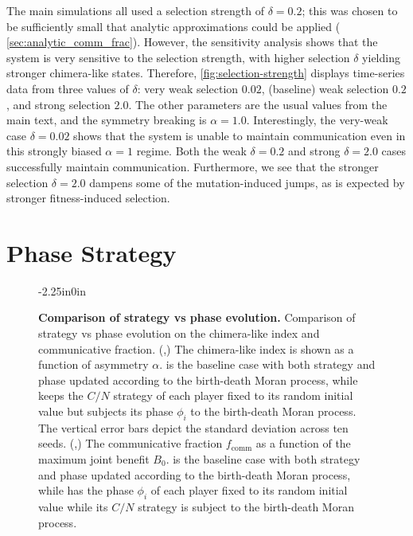 \documentclass[10pt,letterpaper]{article}
\begin{document}
The main simulations all used a selection strength of $\delta = 0.2$;
this was chosen to be sufficiently small that analytic approximations
could be applied (\cf{} \cref{sec:analytic_comm_frac}).
However, the sensitivity analysis shows that the system is very
sensitive to the selection strength, with higher selection $\delta$
yielding stronger chimera-like states.
Therefore, \cref{fig:selection-strength} displays time-series data
from three values of $\delta$: very weak selection $0.02$, (baseline)
weak selection $0.2$, and strong selection $2.0$.
The other parameters are the usual values from the main text,
and the symmetry breaking is $\alpha = 1.0$.
Interestingly, the very-weak case $\delta = 0.02$ shows that the system
is unable to maintain communication even in this strongly biased
$\alpha=1$ regime.
Both the weak $\delta = 0.2$ and strong $\delta = 2.0$ cases
successfully maintain communication.
Furthermore, we see that the stronger selection $\delta = 2.0$
dampens some of the mutation-induced jumps,
as is expected by stronger fitness-induced selection.

\section{Phase \vs{} Strategy}
\begin{figure}
\begin{adjustwidth}{-2.25in}{0in}
  \centering
  \begin{subcaptiongroup}
		\label{fig:chimera-baseline}%
		\label{fig:chimera-strategy-fixed}%
		\label{fig:frac-comm-baseline}%
		\label{fig:frac-comm-phase-fixed}%
  \end{subcaptiongroup}
  \caption{
    \textbf{
			Comparison of strategy vs phase evolution.
    }
		Comparison of strategy vs phase evolution on the chimera-like index
		and communicative fraction.
		(,)
		The chimera-like index is shown as a function of asymmetry $\alpha$.
		is the baseline case with both strategy and phase updated
		according to the birth-death Moran process,
		while
		keeps the $C/N$ strategy of each player fixed
		to its random initial value but subjects its phase $\phi_i$
		to the birth-death Moran process.
		The vertical error bars depict the standard deviation
		across ten seeds.
		(,)
		The communicative fraction $f_{\text{comm}}$ as a function
		of the maximum joint benefit $B_0$.
		is the baseline case with both strategy and phase updated
		according to the birth-death Moran process,
		while
		has the phase $\phi_i$ of each player fixed
		to its random initial value while its $C/N$ strategy is subject
		to the birth-death Moran process.
  }\label{fig:phase-vs-strategy}
\end{adjustwidth}
\end{figure}
\end{document}
